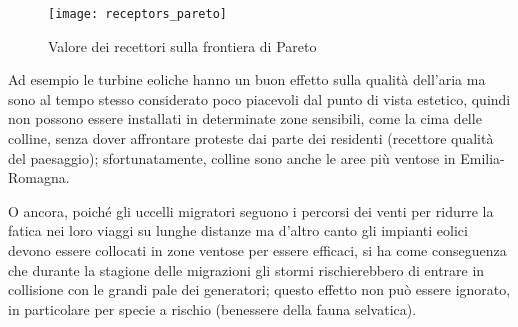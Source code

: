 \documentclass[12pt,a4paper,openright,twoside]{report}
\begin{document}
\begin{figure}[h]
	\centering
	\texttt{[image: receptors\_pareto]}
	\caption{Valore dei recettori sulla frontiera di Pareto}
	\label{receptors_pareto}
\end{figure}

Ad esempio le turbine eoliche hanno un buon effetto sulla qualità dell'aria ma sono al tempo stesso considerato poco piacevoli dal punto di vista estetico, quindi non possono essere installati in determinate zone sensibili, come la cima delle colline, senza dover affrontare proteste dai parte dei residenti (recettore qualità del paesaggio); sfortunatamente, colline sono anche le aree più ventose in Emilia-Romagna. 

O ancora, poiché gli uccelli migratori seguono i percorsi dei venti per ridurre la fatica nei loro viaggi su lunghe distanze ma d'altro canto gli impianti eolici devono essere collocati in zone ventose per essere efficaci, si ha come conseguenza che durante la stagione delle migrazioni gli stormi rischierebbero di entrare in collisione con le grandi pale dei generatori; questo effetto non può essere ignorato, in particolare per specie a rischio (benessere della fauna selvatica).


\nocite{*}


\end{document}
